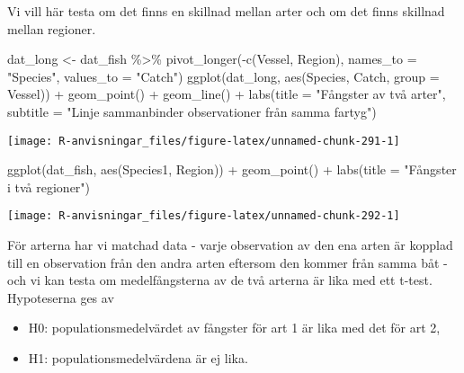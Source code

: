 \documentclass[
]{book}
\newenvironment{Shaded}{\begin{snugshade}}{\end{snugshade}}
\newcommand{\AttributeTok}[1]{\textcolor[rgb]{0.77,0.63,0.00}{#1}}
\newcommand{\FunctionTok}[1]{\textcolor[rgb]{0.00,0.00,0.00}{#1}}
\newcommand{\NormalTok}[1]{#1}
\newcommand{\OtherTok}[1]{\textcolor[rgb]{0.56,0.35,0.01}{#1}}
\newcommand{\SpecialCharTok}[1]{\textcolor[rgb]{0.00,0.00,0.00}{#1}}
\newcommand{\StringTok}[1]{\textcolor[rgb]{0.31,0.60,0.02}{#1}}
\providecommand{\tightlist}{%
  \setlength{\itemsep}{0pt}\setlength{\parskip}{0pt}}
\theoremstyle{definition}
\theoremstyle{definition}
\theoremstyle{definition}
\theoremstyle{definition}
\theoremstyle{remark}
\begin{document}
Vi vill här testa om det finns en skillnad mellan arter och om det finns skillnad mellan regioner.

\begin{Shaded}
\begin{Highlighting}[]
\NormalTok{dat\_long }\OtherTok{\textless{}{-}}\NormalTok{ dat\_fish }\SpecialCharTok{\%\textgreater{}\%} 
  \FunctionTok{pivot\_longer}\NormalTok{(}\SpecialCharTok{{-}}\FunctionTok{c}\NormalTok{(Vessel, Region), }\AttributeTok{names\_to =} \StringTok{"Species"}\NormalTok{, }\AttributeTok{values\_to =} \StringTok{"Catch"}\NormalTok{)}
\FunctionTok{ggplot}\NormalTok{(dat\_long, }\FunctionTok{aes}\NormalTok{(Species, Catch, }\AttributeTok{group =}\NormalTok{ Vessel)) }\SpecialCharTok{+} 
  \FunctionTok{geom\_point}\NormalTok{() }\SpecialCharTok{+} 
  \FunctionTok{geom\_line}\NormalTok{() }\SpecialCharTok{+}
  \FunctionTok{labs}\NormalTok{(}\AttributeTok{title =} \StringTok{"Fångster av två arter"}\NormalTok{, }\AttributeTok{subtitle =} \StringTok{"Linje sammanbinder observationer från samma fartyg"}\NormalTok{)}
\end{Highlighting}
\end{Shaded}

\begin{center}\texttt{[image: R-anvisningar\_files/figure-latex/unnamed-chunk-291-1]} \end{center}

\begin{Shaded}
\begin{Highlighting}[]
\FunctionTok{ggplot}\NormalTok{(dat\_fish, }\FunctionTok{aes}\NormalTok{(Species1, Region)) }\SpecialCharTok{+} 
  \FunctionTok{geom\_point}\NormalTok{() }\SpecialCharTok{+}
  \FunctionTok{labs}\NormalTok{(}\AttributeTok{title =} \StringTok{"Fångster i två regioner"}\NormalTok{)}
\end{Highlighting}
\end{Shaded}

\begin{center}\texttt{[image: R-anvisningar\_files/figure-latex/unnamed-chunk-292-1]} \end{center}

För arterna har vi matchad data - varje observation av den ena arten är kopplad till en observation från den andra arten eftersom den kommer från samma båt - och vi kan testa om medelfångsterna av de två arterna är lika med ett t-test. Hypoteserna ges av

\begin{itemize}
\tightlist
\item
  H0: populationsmedelvärdet av fångster för art 1 är lika med det för art 2,
\item
  H1: populationsmedelvärdena är ej lika.
\end{itemize}
\end{document}
